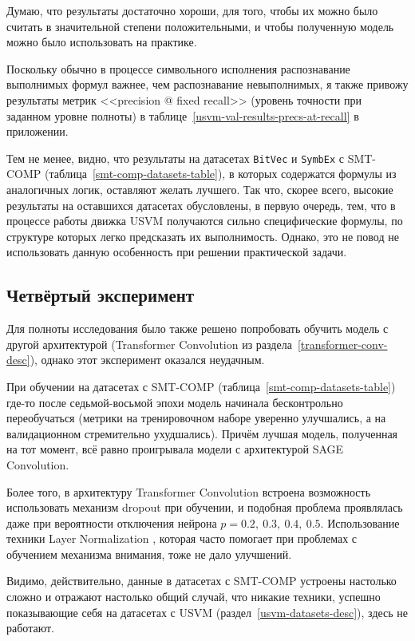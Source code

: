 Думаю, что результаты достаточно хороши, для того, чтобы их можно было считать в значительной степени положительными, и чтобы полученную модель можно было использовать на практике.

Поскольку обычно в процессе символьного исполнения распознавание выполнимых формул важнее, чем распознавание невыполнимых, я также привожу результаты метрик <<precision @ fixed recall>> (уровень точности при заданном уровне полноты) в таблице~\ref{usvm-val-results-precs-at-recall} в приложении.

Тем не менее, видно, что результаты на датасетах \texttt{BitVec} и \texttt{SymbEx} с SMT-COMP (таблица~\ref{smt-comp-datasets-table}), в которых содержатся формулы из аналогичных логик, оставляют желать лучшего. Так что, скорее всего, высокие результаты на оставшихся датасетах обусловлены, в первую очередь, тем, что в процессе работы движка USVM получаются сильно специфические формулы, по структуре которых легко предсказать их выполнимость. Однако, это не повод не использовать данную особенность при решении практической задачи.

\subsection{Четвёртый эксперимент}

Для полноты исследования было также решено попробовать обучить модель с другой архитектурой (Transformer Convolution из раздела~\ref{transformer-conv-desc}), однако этот эксперимент оказался неудачным.

При обучении на датасетах с SMT-COMP (таблица~\ref{smt-comp-datasets-table}) где-то после седьмой-восьмой эпохи модель начинала бесконтрольно переобучаться (метрики на тренировочном наборе уверенно улучшались, а на валидационном стремительно ухудшались). Причём лучшая модель, полученная на тот момент, всё равно проигрывала модели с архитектурой SAGE Convolution.

Более того, в архитектуру Transformer Convolution встроена возможность использовать механизм dropout \cite{dropout-paper} при обучении, и подобная проблема проявлялась даже при вероятности отключения нейрона $p = 0.2, \ 0.3, \ 0.4, \ 0.5$. Использование техники Layer Normalization \cite{layer-norm-paper}, которая часто помогает при проблемах с обучением механизма внимания, тоже не дало улучшений.

Видимо, действительно, данные в датасетах с SMT-COMP устроены настолько сложно и отражают настолько общий случай, что никакие техники, успешно показывающие себя на датасетах с USVM (раздел~\ref{usvm-datasets-desc}), здесь не работают.

